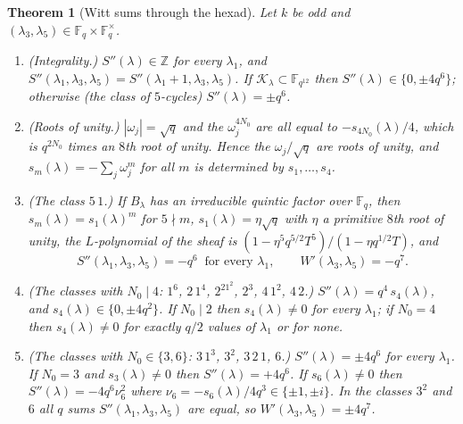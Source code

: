 \documentclass[12pt,a4paper]{amsart}
\newtheorem{theorem}{Theorem}[section]
\theoremstyle{definition}
\newcommand{\F}{\mathbb{F}}
\newcommand{\Z}{\mathbb{Z}}
\newcommand{\Kk}{\mathcal{K}}
\newcommand{\Spp}{S''}
\begin{document}
\begin{theorem}[Witt sums through the hexad]\label{thm:witt}
Let $k$ be odd and $(\lambda_3,\lambda_5)\in\F_q\times\F_q^\times$.
\begin{enumerate}[label=\textup{(\alph*)},leftmargin=2em]
\item\textup{(Integrality.)} $\Spp(\lambda)\in\Z$ for every $\lambda_1$, and $\Spp(\lambda_1,\lambda_3,\lambda_5)=\Spp(\lambda_1+1,\lambda_3,\lambda_5)$. If $\Kk_\lambda\subset\F_{q^{12}}$ then $\Spp(\lambda)\in\{0,\pm4q^6\}$; otherwise (the class of $5$-cycles) $\Spp(\lambda)=\pm q^6$.
\item\textup{(Roots of unity.)} $|\omega_j|=\sqrt q$ and the $\omega_j^{4N_0}$ are all equal to $-s_{4N_0}(\lambda)/4$, which is $q^{2N_0}$ times an $8$th root of unity. Hence the $\omega_j/\sqrt q$ are roots of unity, and $s_m(\lambda)=-\sum_j\omega_j^m$ for all $m$ is determined by $s_1,\dots,s_4$.
\item\textup{(The class $5\,1$.)} If $B_\lambda$ has an irreducible quintic factor over $\F_q$, then $s_m(\lambda)=s_1(\lambda)^m$ for $5\nmid m$, $s_1(\lambda)=\eta\sqrt q$ with $\eta$ a primitive $8$th root of unity, the $L$-polynomial of the sheaf is $(1-\eta^5q^{5/2}T^5)/(1-\eta q^{1/2}T)$, and
\[
\Spp(\lambda_1,\lambda_3,\lambda_5)=-q^6\ \text{ for every }\lambda_1,\qquad W'(\lambda_3,\lambda_5)=-q^7 .
\]
\item\textup{(The classes with $N_0\mid4$: $1^6$, $2\,1^4$, $2^21^2$, $2^3$, $4\,1^2$, $4\,2$.)} $\Spp(\lambda)=q^4\,s_4(\lambda)$, and $s_4(\lambda)\in\{0,\pm4q^2\}$. If $N_0\mid2$ then $s_4(\lambda)\ne0$ for every $\lambda_1$; if $N_0=4$ then $s_4(\lambda)\ne0$ for exactly $q/2$ values of $\lambda_1$ or for none.
\item\textup{(The classes with $N_0\in\{3,6\}$: $3\,1^3$, $3^2$, $3\,2\,1$, $6$.)} $\Spp(\lambda)=\pm4q^6$ for every $\lambda_1$. If $N_0=3$ and $s_3(\lambda)\ne0$ then $\Spp(\lambda)=+4q^6$. If $s_6(\lambda)\ne0$ then $\Spp(\lambda)=-4q^6\nu_6^2$ where $\nu_6=-s_6(\lambda)/4q^3\in\{\pm1,\pm i\}$. In the classes $3^2$ and $6$ all $q$ sums $\Spp(\lambda_1,\lambda_3,\lambda_5)$ are equal, so $W'(\lambda_3,\lambda_5)=\pm4q^7$.
\end{enumerate}
\end{theorem}
\end{document}
